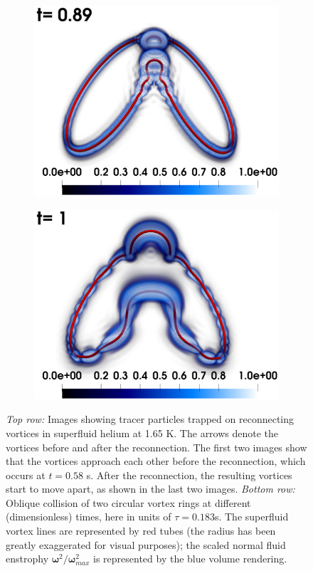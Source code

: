\documentclass[9pt,twocolumn,twoside]{pnas-new}
\newcommand{\bom}{\boldsymbol{\omega}}
\begin{document}
\begin{figure}
\begin{subfigure}[b]{0.24\textwidth}
		\includegraphics*[width=\textwidth]{snap-3.pdf}
	\end{subfigure}
    \begin{subfigure}[b]{0.24\textwidth}
		\centering
		\includegraphics*[width=\textwidth]{snap-4.pdf}
	\end{subfigure}
\caption{\emph{Top row:} Images showing tracer particles trapped on reconnecting vortices in superfluid helium at 1.65 K. The arrows denote the vortices before and after the reconnection. The first two images show that the vortices approach each other before the reconnection, which occurs at $t=0.58$ s. After the reconnection, the resulting vortices start to move apart, as shown in the last two images.
\emph{Bottom row:} Oblique collision of two circular vortex rings at different 
(dimensionless) times, here in units of $\tau=0.183$s.
The superfluid vortex lines are represented by red tubes (the radius has been greatly 
exaggerated for visual purposes); the scaled normal fluid enstrophy 
$\bom^2/\bom^2_{max}$ is represented by the blue volume rendering.}
\label{fig:ring-coll-viz}
\end{figure}
\end{document}
